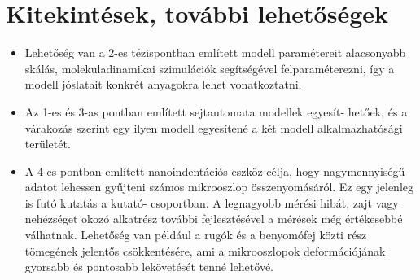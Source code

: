 \documentclass[a5paper,twoside,10pt]{article}
\begin{document}
\section*{Kitekintések, további lehetőségek}
\begin{itemize}
\item Lehetőség van a 2-es tézispontban említett modell paramétereit alacsonyabb skálás, molekuladinamikai szimulációk segítségével felparaméterezni, így a modell jóslatait konkrét anyagokra lehet vonatkoztatni.

\item Az 1-es és 3-as pontban említett sejtautomata modellek egyesít- hetőek, és a várakozás szerint egy ilyen modell egyesítené a két modell alkalmazhatósági területét.

\item A 4-es pontban említett nanoindentációs eszköz célja, hogy nagymennyiségű adatot lehessen gyűjteni számos mikrooszlop összenyomásáról. Ez egy jelenleg is futó kutatás a kutató- csoportban. A legnagyobb mérési hibát, zajt vagy nehézséget okozó alkatrész további fejlesztésével a mérések még értékesebbé válhatnak. Lehetőség van például a rugók és a benyomófej közti rész tömegének jelentős csökkentésére, ami a mikrooszlopok deformációjának gyorsabb és pontosabb lekövetését tenné lehetővé.
\end{itemize}


\begin{spacing}{0.9}
\begin{refcontext}[labelprefix=S]
\printbibliography[keyword={own_publication}, title={Saját publikációim a témában}, resetnumbers]
\end{refcontext}
\printbibliography[notkeyword={own_publication}, title={Irodalomjegyzék},resetnumbers]
\end{spacing}
\end{document}

